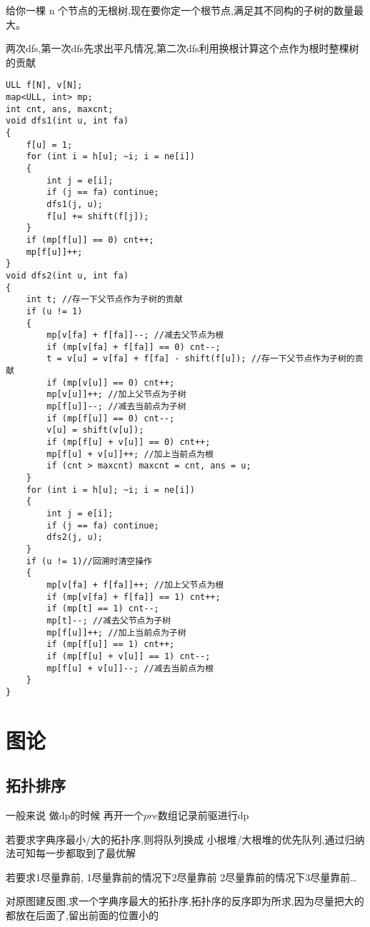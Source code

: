 \documentclass[a4paper, fontset=none]{ctexart}
\begin{document}
给你一棵 n 个节点的无根树,现在要你定一个根节点,满足其不同构的子树的数量最大。

两次dfs,第一次dfs先求出平凡情况,第二次dfs利用换根计算这个点作为根时整棵树的贡献

\begin{verbatim}
ULL f[N], v[N];
map<ULL, int> mp;
int cnt, ans, maxcnt;
void dfs1(int u, int fa)
{
    f[u] = 1;
    for (int i = h[u]; ~i; i = ne[i])
    {
        int j = e[i];
        if (j == fa) continue;
        dfs1(j, u);
        f[u] += shift(f[j]);
    }
    if (mp[f[u]] == 0) cnt++;
    mp[f[u]]++;
}
void dfs2(int u, int fa)
{
    int t; //存一下父节点作为子树的贡献
    if (u != 1)
    {
        mp[v[fa] + f[fa]]--; //减去父节点为根
        if (mp[v[fa] + f[fa]] == 0) cnt--;
        t = v[u] = v[fa] + f[fa] - shift(f[u]); //存一下父节点作为子树的贡献
        if (mp[v[u]] == 0) cnt++;
        mp[v[u]]++; //加上父节点为子树
        mp[f[u]]--; //减去当前点为子树
        if (mp[f[u]] == 0) cnt--;
        v[u] = shift(v[u]);
        if (mp[f[u] + v[u]] == 0) cnt++;
        mp[f[u] + v[u]]++; //加上当前点为根
        if (cnt > maxcnt) maxcnt = cnt, ans = u;
    }
    for (int i = h[u]; ~i; i = ne[i])
    {
        int j = e[i];
        if (j == fa) continue;
        dfs2(j, u);
    }
    if (u != 1)//回溯时清空操作
    {
        mp[v[fa] + f[fa]]++; //加上父节点为根
        if (mp[v[fa] + f[fa]] == 1) cnt++;
        if (mp[t] == 1) cnt--;
        mp[t]--; //减去父节点为子树
        mp[f[u]]++; //加上当前点为子树
        if (mp[f[u]] == 1) cnt++;
        if (mp[f[u] + v[u]] == 1) cnt--;
        mp[f[u] + v[u]]--; //减去当前点为根
    }
}
\end{verbatim}

\section{图论}
\subsection{拓扑排序}
一般来说 做dp的时候 再开一个$pre$数组记录前驱进行dp

若要求字典序最小/大的拓扑序,则将队列换成 小根堆/大根堆的优先队列,通过归纳法可知每一步都取到了最优解

若要求1尽量靠前, 1尽量靠前的情况下2尽量靠前  2尽量靠前的情况下3尽量靠前\ldots{}

对原图建反图,求一个字典序最大的拓扑序,拓扑序的反序即为所求,因为尽量把大的都放在后面了,留出前面的位置小的
\end{document}
